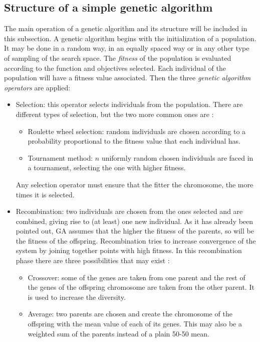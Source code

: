 \subsection{Structure of a simple genetic algorithm}
    
    The main operation of a genetic algorithm and its structure will be included in this subsection. A genetic algorithm begins with the initialization of a population. It may be done in a random way, in an equally spaced way or in any other type of sampling of the search space. The \textit{fitness} of the population is evaluated according to the function and objectives selected. Each individual of the population will have a fitness value associated. Then  the three \textit{genetic algorithm operators} are applied:
    
    \begin{itemize}
        \item Selection: this operator selects individuals from the population. There are different types of selection, but the two more common ones are \cite{zhong2005comparison}:
        \begin{itemize}
            \item Roulette wheel selection: random individuals are chosen according to a probability proportional to the fitness value that each individual has.
            \item Tournament method: $n$ uniformly random chosen individuals are faced in a tournament, selecting the one with higher fitness.
        \end{itemize}
        Any selection operator must ensure that the fitter the chromosome, the more times it is selected.
        \item Recombination: two individuals are chosen from the ones selected and are combined, giving rise to (at least) one new individual. As it has already been pointed out, GA assumes that the higher the fitness of the parents, so will be the fitness of the offspring. Recombination tries to increase convergence of the system by joining together points with high fitness. In this recombination phase there are three possibilities that may exist \cite{thevenin2008and}:
        \begin{itemize}
            \item Crossover: some of the genes are taken from one parent and the rest of the genes of the offspring chromosome are taken from the other parent. It is used to increase the diversity.
            \item Average: two parents are chosen and create the chromosome of the offspring with the mean value of each of its genes. This may also be a weighted sum of the parents instead of a plain 50-50 mean.

\end{itemize}
\end{itemize}
